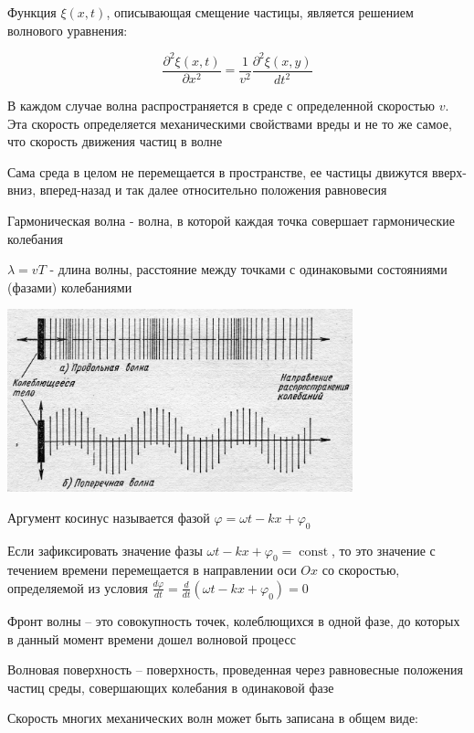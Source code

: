 \documentclass[12pt]{article}
\begin{document}
Функция $\xi(x, t)$, описывающая смещение частицы, является решением волнового уравнения:

\[\frac{\partial^2 \xi(x, t)}{\partial x^2} = \frac{1}{v^2} \frac{\partial^2 \xi(x, y)}{dt^2}\]

В каждом случае волна распространяется в среде с определенной скоростью $v$. Эта скорость определяется механическими
свойствами вреды и не то же самое, что скорость движения частиц в волне

Сама среда в целом не перемещается в пространстве, ее частицы движутся вверх-вниз, вперед-назад и так далее относительно положения равновесия

Гармоническая волна - волна, в которой каждая точка совершает гармонические колебания

$\lambda = v T$ - длина волны, расстояние между точками с одинаковыми состояниями (фазами) колебаниями

\smallvspace

\begin{center}
    \includegraphics[width=0.75\textwidth]{physics2/images/physics2_2025_03_31_1}
\end{center}

\smallvspace

Аргумент косинус называется фазой $\varphi = \omega t - kx + \varphi_0$

Если зафиксировать значение фазы $\omega t - kx + \varphi_0 = \operatorname{const}$, то это значение с течением
времени перемещается в направлении оси $Ox$ со скоростью, определяемой из условия $\frac{d\varphi}{dt} = \frac{d}{dt} (\omega t - kx + \varphi_0) = 0$

Фронт волны -- это совокупность точек, колеблющихся в одной фазе, до которых в данный момент времени дошел волновой процесс

Волновая поверхность -- поверхность, проведенная через равновесные положения частиц среды, совершающих колебания в одинаковой фазе

Скорость многих механических волн может быть записана в общем виде: 
\end{document}
